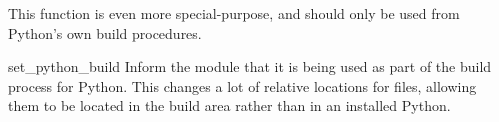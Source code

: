 This function is even more special-purpose, and should only be used
from Python's own build procedures.

\begin{funcdesc}{set_python_build}{}
  Inform the  module that it is being used
  as part of the build process for Python.  This changes a lot of
  relative locations for files, allowing them to be located in the
  build area rather than in an installed Python.
\end{funcdesc}
